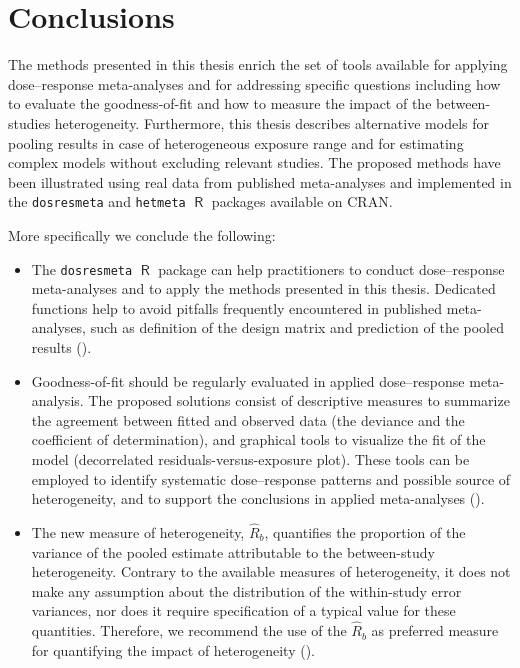 \documentclass[11pt,a4paper,twoside,openany]{book}\usepackage{knitr}
\DeclareMathOperator{\R}{\textsf{R}}
\begin{document}
{%

%

\chapter{Conclusions}

The methods presented in this thesis enrich the set of tools available for applying dose--response meta-analyses and for addressing specific questions including how to evaluate the goodness-of-fit and how to measure the impact of the between-studies heterogeneity. Furthermore, this thesis describes alternative models for pooling results in case of heterogeneous exposure range and for estimating complex models without excluding relevant studies. The proposed methods have been illustrated using real data from published meta-analyses and implemented in the \texttt{dosresmeta} and \texttt{hetmeta} $\R$ packages available on CRAN. 

More specifically we conclude the following:

\begin{itemize}

\item The \texttt{dosresmeta} $\R$ package can help practitioners to conduct dose--response meta-analyses and to apply the methods presented in this thesis. Dedicated functions help to avoid pitfalls frequently encountered in published meta-analyses, such as definition of the design matrix and prediction of the pooled results ().

\item Goodness-of-fit should be regularly evaluated in applied dose--response meta-analysis. The proposed solutions consist of descriptive measures to summarize the agreement between fitted and observed data (the deviance and the coefficient of determination), and graphical tools to visualize the fit of the model (decorrelated residuals-versus-exposure plot). These tools can be employed to identify systematic dose--response patterns and possible source of heterogeneity, and to support the conclusions in applied meta-analyses ().

\item The new measure of heterogeneity, $\hat R_b$, quantifies the proportion of the variance of the pooled estimate attributable to the between-study heterogeneity. Contrary to the available measures of heterogeneity, it does not make any assumption about the distribution of the within-study error variances, nor does it require specification of a typical value for these quantities. Therefore, we recommend the use of the $\hat R_b$ as preferred measure for quantifying the impact of heterogeneity (). 


\end{itemize}}
\end{document}

